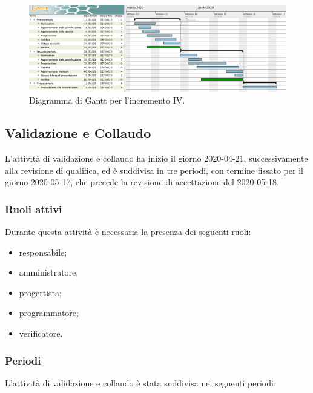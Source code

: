 		\begin{landscape}
          \begin{figure}[H]
            \centering
            \includegraphics[width=\linewidth]{images/ganttDettaglioCodifica} %
            \caption{Diagramma di Gantt per l'incremento IV.}
          \end{figure}		
		\end{landscape}


		\subsection{Validazione e Collaudo}	
		
			L'attività di validazione e collaudo ha inizio il giorno 2020-04-21, successivamente alla revisione di qualifica, ed è suddivisa in tre periodi, con termine fissato per il giorno 2020-05-17, che precede la revisione di accettazione del 2020-05-18.
			
			\subsubsection{Ruoli attivi}
			
			Durante questa attività è necessaria la presenza dei seguenti ruoli:
			\begin{itemize}
				\item responsabile;
				\item amministratore;
				\item progettista;
				\item programmatore;
				\item verificatore.
			\end{itemize}
			
			\subsubsection{Periodi}
			
				L'attività di validazione e collaudo è stata suddivisa nei seguenti periodi:
		

